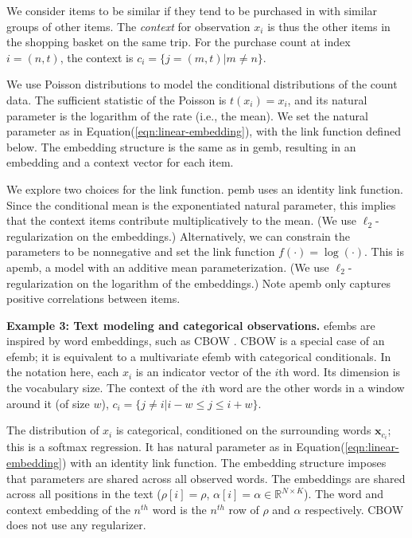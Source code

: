 \documentclass[12pt]{article}
\DeclareRobustCommand{\parhead}[1]{\vspace{0.05in} \textbf{#1} }
\DeclareRobustCommand{\mb}[1]{\ensuremath{\boldsymbol{\mathbf{#1}}}}
\begin{document}
We consider items to be similar if they tend to be purchased in with
similar groups of other items. The \textit{context} for observation
$x_{i}$ is thus the other items in the shopping basket on the same
trip. For the purchase count at index $i=(n,t)$, the context is
$c_i = \{ j=(m,t) | m\neq n\}$.

We use Poisson distributions to model the conditional distributions of
the count data. The sufficient statistic of the Poisson is
$t(x_{i})= x_{i}$, and its natural parameter is the logarithm of the
rate (i.e., the mean). We set the natural parameter as in
Equation\nobreakspace \textup {(\ref {eqn:linear-embedding})}, with the link function defined below. The
embedding structure is the same as in \gls{gemb}, resulting in an
embedding and a context vector for each item.

We explore two choices for the link function. \gls{pemb} uses an
identity link function. Since the conditional mean is the
exponentiated natural parameter, this implies that the context items
contribute multiplicatively to the mean. (We use
$\ell_2$-regularization on the embeddings.)  Alternatively, we can
constrain the parameters to be nonnegative and set the link function
$f(\cdot)=\log(\cdot)$.  This is \gls{apemb}, a model with an additive
mean parameterization.  (We use $\ell_2$-regularization on the
logarithm of the embeddings.) Note \gls{apemb} only captures positive
correlations between items.

\parhead{Example 3: Text modeling and categorical observations.}
\glspl{efemb} are inspired by word embeddings, such as \gls{CBOW}
\citep{mikolov2013efficient}. \gls{CBOW} is a special case of an
\gls{efemb}; it is equivalent to a multivariate \gls{efemb} with
categorical conditionals. In the notation here, each $x_i$ is an
indicator vector of the $i$th word. Its dimension is the vocabulary
size. The context of the $i$th word are the other words in a window
around it (of size $w$), $c_i = \{j\neq i | i-w \leq j \leq i+w \}$.

The distribution of $x_i$ is categorical, conditioned on the
surrounding words ${\mb{x}}_{c_i}$; this is a softmax regression.  It has
natural parameter as in Equation\nobreakspace \textup {(\ref {eqn:linear-embedding})} with an identity
link function. The embedding structure imposes that parameters are
shared across all observed words. The embeddings are shared across 
all positions in the text 
($\rho[i] = \rho$, $\alpha[i] = \alpha \in \mathbb{R}^{N\times K}$). 
The word and context embedding of the $n^{th}$ word is the 
$n^{th}$ row of $\rho$ and $\alpha$ respectively. 
\gls{CBOW} does not use any regularizer.
\end{document}
